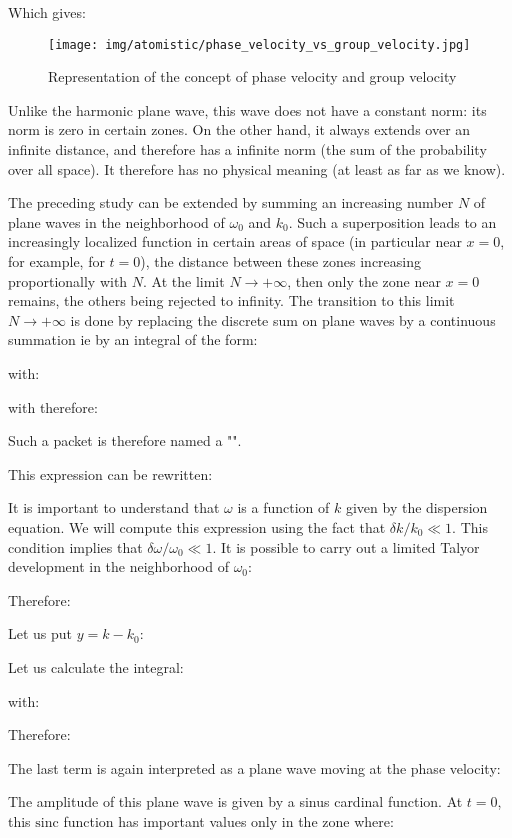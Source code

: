 	Which gives:
	\begin{figure}[H]
		\centering
		\texttt{[image: img/atomistic/phase\_velocity\_vs\_group\_velocity.jpg]}	
		\caption{Representation of the concept of phase velocity and group velocity}
	\end{figure}
	Unlike the harmonic plane wave, this wave does not have a constant norm: its norm is zero in certain zones. On the other hand, it always extends over an infinite distance, and therefore has a infinite norm (the sum of the probability over all space). It therefore has no physical meaning (at least as far as we know).

	The preceding study can be extended by summing an increasing number $N$ of plane waves in the neighborhood of $\omega_0$ and $k_0$. Such a superposition leads to an increasingly localized function in certain areas of space (in particular near $x=0$, for example, for $t=0$), the distance between these zones increasing proportionally with $N$. At the limit $N\rightarrow +\infty$, then only the zone near $x=0$ remains, the others being rejected to infinity. The transition to this limit  $N\rightarrow +\infty$ is done by replacing the discrete sum on plane waves by a continuous summation ie by an integral of the form:
	
	with:
	
	with therefore:
	
	Such a packet is therefore named a "".

	This expression can be rewritten:
	
	It is important to understand that $\omega$ is a function of $k$ given by the dispersion equation. We will compute this expression using the fact that $\delta k/k_0\ll 1$. This condition implies that $\delta \omega/\omega_0\ll 1$. It is possible to carry out a limited Talyor development in the neighborhood of $\omega_0$:
	
	Therefore:
	
	Let us put $y=k-k_0$:
	
	Let us calculate the integral:
	
	with:
	
	Therefore:
	
	The last term is again interpreted as a plane wave moving at the phase velocity:
	
	The amplitude of this plane wave is given by a sinus cardinal function. At $t=0$, this $\mathrm{sinc}$ function has important values only in the zone where:
	
